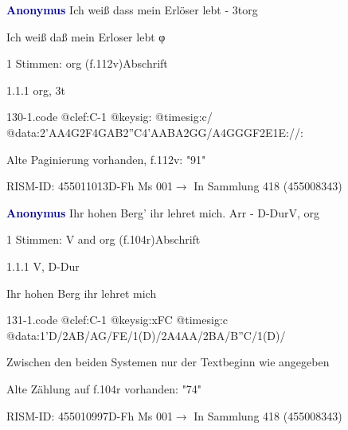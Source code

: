 \documentclass[twocolumn, 12pt]{book}
\begin{document}
\par \vspace{16pt} \textcolor{darkblue}{\textbf{Anonymus  }}\hfillplus{\textbf{[130]}}\newline Ich weiß dass mein Erlöser lebt - 3t\newline org
\par \begin{itshape}[f.112v, heading:] Ich weiß daß mein Erloser lebt φ\end{itshape} 
\par \textcolor{darkblue}{}  1 Stimmen: org  (f.112v)\newline Abschrift
\par 1.1.1  org, 3t  
\begin{filecontents*}{130-1.code}
@clef:C-1
@keysig:
@timesig:c/
@data:2'AA4G2F4GAB2''C4'AABA2GG/A4GGGF2E1E://:
\end{filecontents*}
\newline %
\par Alte Paginierung vorhanden, f.112v: "91"
\par RISM-ID: 455011013\newline D-Fh  Ms 001\newline $\rightarrow$ In Sammlung 418 (455008343)
      
\par \vspace{16pt} \textcolor{darkblue}{\textbf{Anonymus  }}\hfillplus{\textbf{[131]}}\newline Ihr hohen Berg' ihr lehret mich. Arr - D-Dur\newline V, org
\par \begin{itshape}\end{itshape} 
\par \textcolor{darkblue}{}  1 Stimmen: V and org  (f.104r)\newline Abschrift
\par 1.1.1  V, D-Dur\newline \begin{footnotesize} Ihr hohen Berg ihr lehret mich \end{footnotesize}  
\begin{filecontents*}{131-1.code}
@clef:C-1
@keysig:xFC
@timesig:c
@data:1'D/2AB/AG/FE/1(D)/2A4AA/2BA/B''C/1(D)/
\end{filecontents*}
\newline %
\par Zwischen den beiden Systemen nur der Textbeginn wie angegeben
\par Alte Zählung auf f.104r vorhanden: "74"
\par RISM-ID: 455010997\newline D-Fh  Ms 001\newline $\rightarrow$ In Sammlung 418 (455008343)
      
\end{document}
